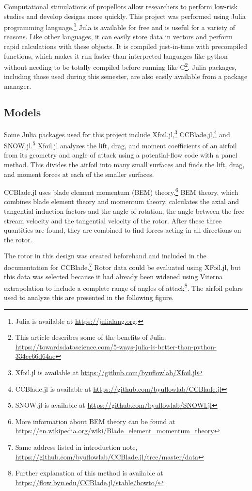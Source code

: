 \documentclass[journal ]{new-aiaa}
\begin{document}
Computational stimulations of propellors allow researchers to perform low-risk studies and develop designs more quickly. This project was performed using Julia programming language.\footnote{Julia is available at \url{https://julialang.org}.} Jula is available for free and is useful for a variety of reasons. Like other languages, it can easily store data in vectors and perform rapid calculations with these objects. It is compiled just-in-time with precompiled functions, which makes it run faster than interpreted languages like python without needing to be totally compiled before running like C\footnote{This article describes some of the benefits of Julia. \url{https://towardsdatascience.com/5-ways-julia-is-better-than-python-334cc66d64ae}}. Julia  packages, including those used during this semester, are also easily available from a package manager.

\subsection{Models}

Some Julia packages used for this project include Xfoil.jl,\footnote{Xfoil.jl is available at \url{https://github.com/byuflowlab/Xfoil.jl}} CCBlade,jl,\footnote{CCBlade.jl is available at \url{https://github.com/byuflowlab/CCBlade.jl}} and SNOW.jl.\footnote{SNOW.jl is available at \url{https://github.com/byuflowlab/SNOWl.jl}} Xfoil.jl analyzes the lift, drag, and moment coefficients of an airfoil from its geometry and angle of attack using a potential-flow code with a panel method. This divides the airfoil into many small surfaces and finds the lift, drag, and moment forces at each of the smaller surfaces. 

CCBlade.jl uses blade element momentum (BEM) theory.\footnote{More information about BEM theory can be found at \url{https://en.wikipedia.org/wiki/Blade_element_momentum_theory}} BEM theory, which combines blade element theory and momentum theory, calculates the axial and tangential induction factors and the angle of rotation, the angle between the free stream velocity and the tangential velocity of the rotor. After these three quantities are found, they are combined to find forces acting in all directions on the rotor\cite{CCBlade}.

The rotor in this design was created beforehand and included in the documentation for CCBlade.\footnote{Same address listed in introduction note, \url{https://github.com/byuflowlab/CCBlade.jl/tree/master/data}} Rotor data could be evaluated using XFoil.jl, but this data was selected because it had already been widened using Viterna extrapolation to include a complete range of angles of attack\footnote{Further explanation of this method is available at \url{https://flow.byu.edu/CCBlade.jl/stable/howto/}}. The airfoil polars used to analyze this are presented in the following figure. 
\end{document}
